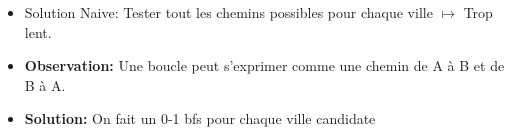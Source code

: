 \begin{frame}
    \frametitle{\problemtitle}
    \begin{itemize}
        \begin{block}{Problème}
            \textbf{Problem:} Un graphe avec $n$ villes et $m$ villes candidates, trouver la ville candidate dont le cycle est le plus petit.
        \end{block}
        \item<+-> Solution Naive: Tester tout les chemins possibles pour chaque ville $\mapsto$ Trop lent.
        \item<+-> \textbf{Observation:} Une boucle peut s'exprimer comme une chemin de A à B et de B à A.
        \item<+-> \textbf{Solution:} On fait un 0-1 bfs pour chaque ville candidate
    \end{itemize}
\end{frame}
